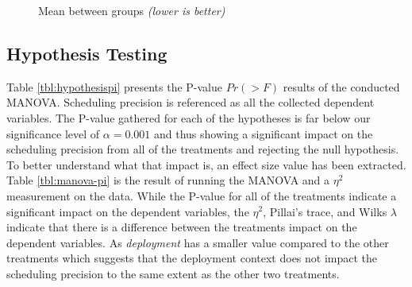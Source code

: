 \mydata
\begin{figure}[H]
\caption{Mean between groups \textit{(lower is better)}}
\label{fig:pi-mean-chart}
\end{figure}


\subsection{Hypothesis Testing}

Table \ref{tbl:hypothesispi} presents the P-value $Pr(>F)$ results of the conducted MANOVA. Scheduling precision is referenced as all the collected dependent variables. The P-value gathered for each of the hypotheses is far below our significance level of $\alpha = 0.001$ and thus showing a significant impact on the scheduling precision from all of the treatments and rejecting the null hypothesis. To better understand what that impact is, an effect size value has been extracted. Table \ref{tbl:manova-pi} is the result of running the MANOVA and a $\eta^{2}$ measurement on the data. While the P-value for all of the treatments indicate a significant impact on the dependent variables, the $\eta^{2}$, Pillai's trace, and Wilks $\lambda$ indicate that there is a difference between the treatments impact on the dependent variables. As \textit{deployment} has a smaller value compared to the other treatments which suggests that the deployment context does not impact the scheduling precision to the same extent as the other two treatments.

